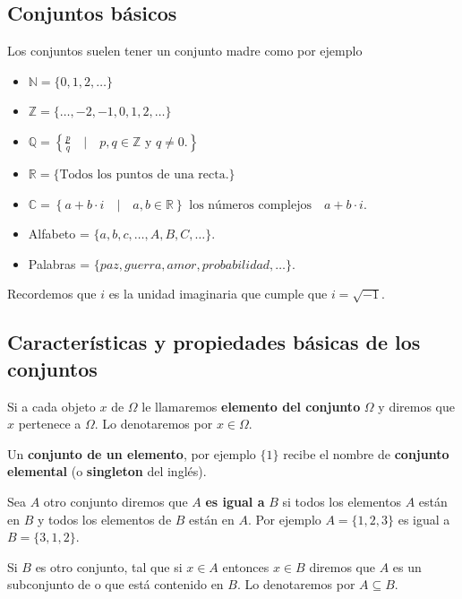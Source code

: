 \documentclass[
  letterpaper,
  DIV=11,
  numbers=noendperiod]{scrreprt}
\begin{document}
\subsection{Conjuntos básicos}\label{conjuntos-buxe1sicos}

Los conjuntos suelen tener un conjunto madre como por ejemplo

\begin{itemize}
\item
  \(\mathbb{N}=\{0,1,2,\ldots\}\)
\item
  \(\mathbb{Z}=\{\ldots,-2,-1,0,1,2,\ldots\}\)
\item
  \(\mathbb{Q}=\left\{\frac{p}{q}\quad\Big|\quad p,q\in \mathbb{Z} \mbox{ y } q \not= 0.\right\}\)
\item
  \(\mathbb{R}=\{\mbox{Todos los puntos de una recta.}\}\)
\item
  \(\mathbb{C}= \left\{a+b\cdot i\quad \big|\quad a,b\in \mathbb{R}\right\}\mbox{ los números complejos}\quad a+b\cdot i.\)
\item
  Alfabeto = \(\{a,b,c,\ldots, A,B,C,\ldots\}.\)
\item
  Palabras = \(\{paz, guerra, amor, probabilidad,\ldots\}.\)
\end{itemize}

Recordemos que \(i\) es la unidad imaginaria que cumple que
\(i=\sqrt{-1}\).

\subsection{Características y propiedades básicas de los
conjuntos}\label{caracteruxedsticas-y-propiedades-buxe1sicas-de-los-conjuntos}

Si a cada objeto \(x\) de \(\Omega\) le llamaremos \textbf{elemento del
conjunto} \(\Omega\) y diremos que \(x\) pertenece a \(\Omega\). Lo
denotaremos por \(x\in \Omega\).

Un \textbf{conjunto de un elemento}, por ejemplo \(\{1\}\) recibe el
nombre de \textbf{conjunto elemental} (o \textbf{singleton} del inglés).

Sea \(A\) otro conjunto diremos que \(A\) \textbf{es igual a} \(B\) si
todos los elementos \(A\) están en \(B\) y todos los elementos de \(B\)
están en \(A\). Por ejemplo \(A=\{1,2,3\}\) es igual a \(B=\{3,1,2\}\).

Si \(B\) es otro conjunto, tal que si \(x\in A\) entonces \(x\in B\)
diremos que \(A\) es un subconjunto de o que está contenido en \(B\). Lo
denotaremos por \(A\subseteq B.\)
\end{document}
